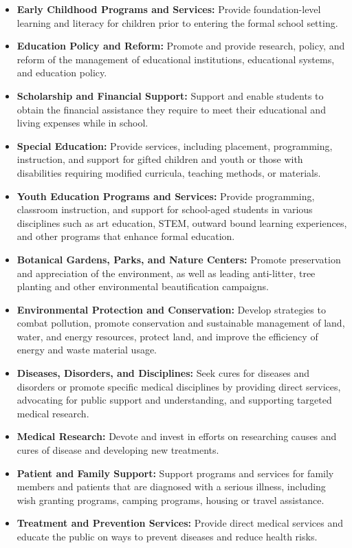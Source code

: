 \begin{itemize}
    \item \textbf{Early Childhood Programs and Services:} Provide foundation-level learning and literacy for children prior to entering the formal school setting.
    \item \textbf{Education Policy and Reform:} Promote and provide research, policy, and reform of the management of educational institutions, educational systems, and education policy.
    \item \textbf{Scholarship and Financial Support:} Support and enable students to obtain the financial assistance they require to meet their educational and living expenses while in school.
    \item \textbf{Special Education:} Provide services, including placement, programming, instruction, and support for gifted children and youth or those with disabilities requiring modified curricula, teaching methods, or materials.
    \item \textbf{Youth Education Programs and Services:} Provide programming, classroom instruction, and support for school-aged students in various disciplines such as art education, STEM, outward bound learning experiences, and other programs that enhance formal education.
    \item \textbf{Botanical Gardens, Parks, and Nature Centers:} Promote preservation and appreciation of the environment, as well as leading anti-litter, tree planting and other environmental beautification campaigns.
    \item \textbf{Environmental Protection and Conservation:} Develop strategies to combat pollution, promote conservation and sustainable management of land, water, and energy resources, protect land, and improve the efficiency of energy and waste material usage.
    \item \textbf{Diseases, Disorders, and Disciplines:} Seek cures for diseases and disorders or promote specific medical disciplines by providing direct services, advocating for public support and understanding, and supporting targeted medical research.
    \item \textbf{Medical Research:} Devote and invest in efforts on researching causes and cures of disease and developing new treatments.
    \item \textbf{Patient and Family Support:} Support programs and services for family members and patients that are diagnosed with a serious illness, including wish granting programs, camping programs, housing or travel assistance.
    \item \textbf{Treatment and Prevention Services:} Provide direct medical services and educate the public on ways to prevent diseases and reduce health risks.

\end{itemize}
